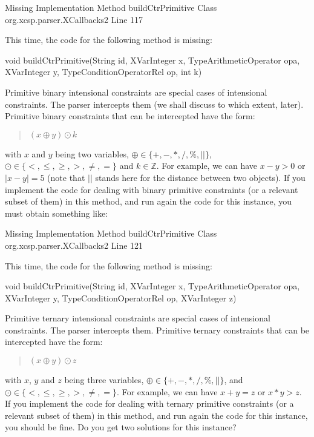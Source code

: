 \documentclass[10pt]{article}
\newenvironment{boxabsc}
               {\medskip \begin{bclogo}[barre=none,arrondi=0.2,logo=]{}\vspace{-0.6cm}}
               {\vspace{-0.1cm}\end{bclogo} \smallskip}
\begin{document}
\begin{boxabsc}
\begin{absc}
Missing Implementation
  Method buildCtrPrimitive
  Class org.xcsp.parser.XCallbacks2
  Line 117
\end{absc} 
\end{boxabsc}


This time, the code for the following method is missing:

\begin{boxabsc}
\begin{absc}
void buildCtrPrimitive(String id, XVarInteger x, TypeArithmeticOperator opa, XVarInteger y, TypeConditionOperatorRel op, int k) 		
\end{absc} 
\end{boxabsc}
 
Primitive binary intensional constraints are special cases of intensional constraints.
The parser intercepts them (we shall discuss to which extent, later).
Primitive binary constraints that can be intercepted have the form:
\begin{quote}
$(x \oplus y) \odot k$
\end{quote}
with $x$ and $y$ being two variables, $\oplus \in \{+,-,*,/,\%,||\}$, $\odot \in \{<,\leq,\geq,>,\neq,=\}$ and $k \in \mathbb{Z}$.
For example, we can have $x-y>0$ or $|x-y| = 5$ (note that $||$ stands here for the distance between two objects).
If you implement the code for dealing with binary primitive constraints (or a relevant subset of them) in this method, and run again the code for this instance, you must obtain something like:

\begin{boxabsc}
\begin{absc}
Missing Implementation
  Method buildCtrPrimitive
  Class org.xcsp.parser.XCallbacks2
  Line 121
\end{absc} 
\end{boxabsc}


This time, the code for the following method is missing:

\begin{boxabsc}
\begin{absc}
void buildCtrPrimitive(String id, XVarInteger x, TypeArithmeticOperator opa, XVarInteger y, TypeConditionOperatorRel op, XVarInteger z) 
\end{absc} 
\end{boxabsc}

Primitive ternary intensional constraints are special cases of intensional constraints.
The parser intercepts them.
Primitive ternary constraints that can be intercepted have the form:
\begin{quote}
$(x \oplus y) \odot z$
\end{quote}
with $x$, $y$ and $z$ being three variables, $\oplus \in \{+,-,*,/,\%,||\}$, and $\odot \in \{<,\leq,\geq,>,\neq,=\}$.
For example, we can have $x+y=z$ or $x*y > z$.
If you implement the code for dealing with ternary primitive constraints (or a relevant subset of them) in this method, and run again the code for this instance, you should be fine.
Do you get two solutions for this instance?
\end{document}
